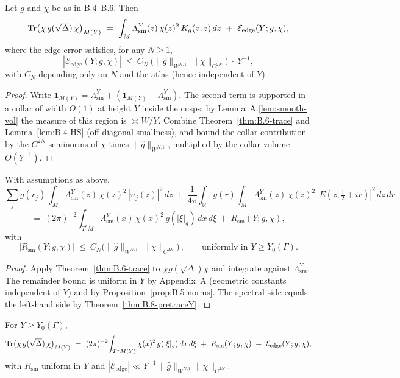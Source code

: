 \begin{proposition}\label{prop:B.9-diff}
Let $g$ and $\chi$ be as in B.4–B.6. Then
\[
\operatorname{Tr}\!\big(\chi\,g(\sqrt\Delta)\,\chi\big)_{M(Y)}
\ =\ \int_{M} \Lambda^Y_{\mathrm{sm}}(z)\, \chi(z)^2\, K_g(z,z)\,dz
\ +\ \mathcal E_{\mathrm{edge}}(Y;g,\chi),
\]
where the edge error satisfies, for any $N\ge 1$,
\[
|\mathcal E_{\mathrm{edge}}(Y;g,\chi)|
\ \le\ C_N\ \Big(\|\widehat g\|_{W^{N,1}}\,\|\chi\|_{C^{2N}}\Big)\ \cdot\ Y^{-1},
\]
with $C_N$ depending only on $N$ and the atlas (hence independent of $Y$).
\end{proposition}

\begin{proof}
Write $\mathbf 1_{M(Y)} = \Lambda^Y_{\mathrm{sm}} + (\mathbf 1_{M(Y)}-\Lambda^Y_{\mathrm{sm}})$.
The second term is supported in a collar of width $O(1)$ at height $Y$ inside the cusps;
by Lemma~A.\ref{lem:smooth-vol} the measure of this region is $\asymp W/Y$. Combine
Theorem~\ref{thm:B.6-trace} and Lemma~\ref{lem:B.4-HS} (off-diagonal smallness),
and bound the collar contribution by the $C^{2N}$ seminorms of $\chi$ times $\|\widehat g\|_{W^{N,1}}$,
multiplied by the collar volume $O(Y^{-1})$.
\end{proof}

\begin{theorem}\label{thm:B.9-smoothtrace}
With assumptions as above,
\[
\sum_j g(r_j)\,\int_{M} \Lambda^Y_{\mathrm{sm}}(z)\,\chi(z)^2\,|u_j(z)|^2\,dz
\ +\ \frac{1}{4\pi}\int_{\mathbb R} g(r)\!\int_{M} \Lambda^Y_{\mathrm{sm}}(z)\,\chi(z)^2\,|E(z,\tfrac12+ir)|^2\,dz\,dr
\]
\[
=\ (2\pi)^{-2}\!\int_{T^*M} \Lambda^Y_{\mathrm{sm}}(x)\,\chi(x)^2\, g(|\xi|_g)\,dx\,d\xi\ +\ R_{\mathrm{sm}}(Y;g,\chi),
\]
with
\[
|R_{\mathrm{sm}}(Y;g,\chi)|\ \le\ C_N\Big(\|\widehat g\|_{W^{N,1}}\,\|\chi\|_{C^{2N}}\Big)\,,
\qquad \text{uniformly in } Y\ge Y_0(\Gamma).
\]
\end{theorem}

\begin{proof}
Apply Theorem~\ref{thm:B.6-trace} to $\chi g(\sqrt\Delta)\chi$ and integrate against $\Lambda^Y_{\mathrm{sm}}$.
The remainder bound is uniform in $Y$ by Appendix~A (geometric constants independent of $Y$) and by
Proposition~\ref{prop:B.5-norms}. The spectral side equals the left-hand side by Theorem~\ref{thm:B.8-pretraceY}.
\end{proof}

\begin{corollary}\label{cor:B.9-sharp}
For $Y\ge Y_0(\Gamma)$,
\[
\operatorname{Tr}\!\big(\chi\,g(\sqrt\Delta)\,\chi\big)_{M(Y)}
\ =\ (2\pi)^{-2}\!\int_{T^*M(Y)} \chi(x)^2\, g(|\xi|_g)\,dx\,d\xi
\ +\ R_{\mathrm{sm}}(Y;g,\chi)\ +\ \mathcal E_{\mathrm{edge}}(Y;g,\chi),
\]
with $R_{\mathrm{sm}}$ uniform in $Y$ and $|\mathcal E_{\mathrm{edge}}|\ll Y^{-1}\,\|\widehat g\|_{W^{N,1}}\|\chi\|_{C^{2N}}$.
\end{corollary}

